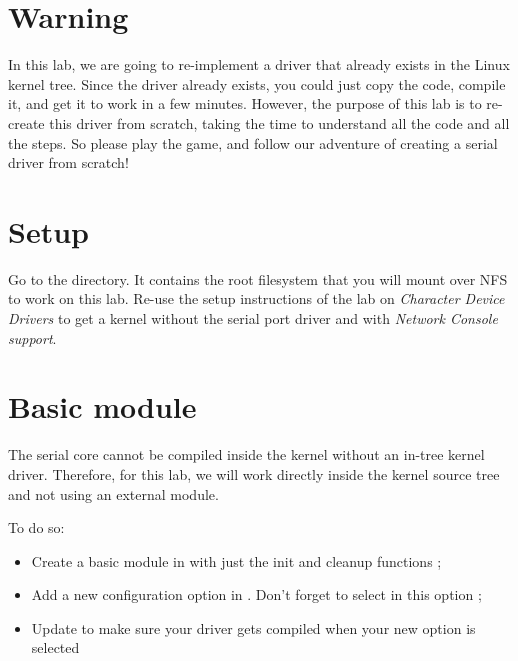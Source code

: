 
\section{Warning}

In this lab, we are going to re-implement a driver that already exists
in the Linux kernel tree. Since the driver already exists, you could
just copy the code, compile it, and get it to work in a few
minutes. However, the purpose of this lab is to re-create this driver
from scratch, taking the time to understand all the code and all the
steps. So please play the game, and follow our adventure of creating a
serial driver from scratch!

\section{Setup}

Go to the  directory. It
contains the root filesystem that you will mount over NFS to work on
this lab. Re-use the setup instructions of the lab on {\em Character
Device Drivers} to get a kernel without the serial port driver and
with {\em Network Console support}.

\section{Basic module}

The serial core cannot be compiled inside the kernel without an
in-tree kernel driver. Therefore, for this lab, we will work directly
inside the kernel source tree and not using an external module.

To do so:

\begin{itemize}

\item Create a basic module in  with
  just the init and cleanup functions ;

\item Add a new configuration option in
  . Don't forget to select
   in this option ;

\item Update  to make sure your
  driver gets compiled when your new option is selected

\end{itemize}

